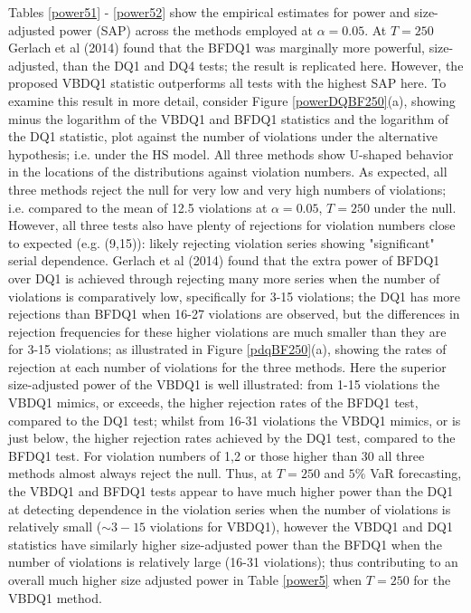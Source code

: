 \documentclass[12pt,epsf]{article}
\begin{document}
Tables \ref{power51} - \ref{power52} show the empirical estimates for power and size-adjusted power (SAP) across the methods
employed at $\alpha=0.05$. At $T=250$ Gerlach et al (2014) found that the BFDQ1 was marginally more powerful, size-adjusted, than
the DQ1 and DQ4 tests; the result is replicated here. However, the proposed VBDQ1 statistic outperforms all tests with the highest
SAP here. To examine this result in more detail, consider Figure \ref{powerDQBF250}(a), showing minus the logarithm of
the VBDQ1 and BFDQ1 statistics and the logarithm of the DQ1 statistic, plot against the number of violations under the alternative hypothesis;
i.e. under the HS model. All three methods show U-shaped behavior in the locations of the distributions against violation numbers. 
As expected, all three methods reject the null for very low and very high numbers of violations; i.e. compared to the mean of 12.5 
violations at $\alpha=0.05$, $T=250$ under the null. However, all three tests also have plenty of rejections for violation numbers 
close to expected (e.g. (9,15)): likely rejecting violation series showing "significant" serial dependence. 
Gerlach et al (2014) found that the extra power of BFDQ1 over DQ1 is achieved through rejecting many more series when the number of 
violations is comparatively low, specifically for 3-15 violations; the DQ1 has more rejections than BFDQ1 when 16-27 violations are 
observed, but the differences in rejection frequencies for these higher violations are much smaller than
they are for 3-15 violations; as illustrated in Figure \ref{pdqBF250}(a), showing the rates of rejection at each number of violations for the
three methods. Here the superior size-adjusted power of the VBDQ1 is well illustrated: from 1-15 violations the VBDQ1 mimics, or exceeds, the
higher rejection rates of the BFDQ1 test, compared to the DQ1 test; whilst from 16-31 violations the VBDQ1 mimics, or is just below,
the higher rejection rates achieved by the DQ1 test, compared to the BFDQ1 test. For violation numbers of 1,2 or those higher than 30 
all three methods almost always reject the null. Thus, at $T=250$ and $5\%$ VaR forecasting, the VBDQ1 and BFDQ1 tests
appear to have much higher power than the DQ1 at detecting dependence in the violation series when the number of 
violations is relatively small ($\sim 3-15$ violations for VBDQ1), however the VBDQ1 and DQ1 statistics have similarly higher 
size-adjusted power than the BFDQ1 when the number of violations is relatively large (16-31 violations); thus contributing to an 
overall much higher size adjusted power in Table \ref{power5} when $T=250$ for the VBDQ1 method.
\end{document}
